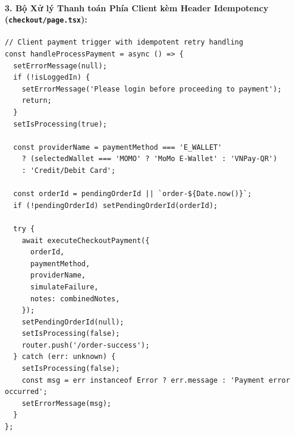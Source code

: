 \documentclass[a4paper]{article}
\begin{document}
\paragraph{3. Bộ Xử lý Thanh toán Phía Client kèm Header Idempotency (\texttt{checkout/page.tsx}):}
\begin{lstlisting}[caption={Client Checkout Payment Handler with Idempotency Key}]
// Client payment trigger with idempotent retry handling
const handleProcessPayment = async () => {
  setErrorMessage(null);
  if (!isLoggedIn) {
    setErrorMessage('Please login before proceeding to payment');
    return;
  }
  setIsProcessing(true);
  
  const providerName = paymentMethod === 'E_WALLET' 
    ? (selectedWallet === 'MOMO' ? 'MoMo E-Wallet' : 'VNPay-QR')
    : 'Credit/Debit Card';

  const orderId = pendingOrderId || `order-${Date.now()}`;
  if (!pendingOrderId) setPendingOrderId(orderId);

  try {
    await executeCheckoutPayment({
      orderId,
      paymentMethod,
      providerName,
      simulateFailure,
      notes: combinedNotes,
    });
    setPendingOrderId(null);
    setIsProcessing(false);
    router.push('/order-success');
  } catch (err: unknown) {
    setIsProcessing(false);
    const msg = err instanceof Error ? err.message : 'Payment error occurred';
    setErrorMessage(msg);
  }
};
\end{lstlisting}
\end{document}
